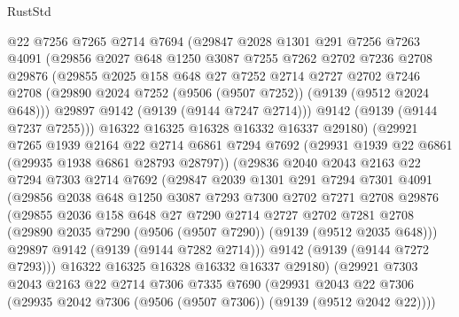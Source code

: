 \begin{lexlean}{RustStd}
\begin{coremodule}
        @22
        @7256
        @7265
        @2714
        @7694
        (@29847
          @2028
          @1301
          @291
          @7256
          @7263
          @4091
          (@29856
            @2027
            @648
            @1250
            @3087
            @7255
            @7262
            @2702
            @7236
            @2708
            @29876
            (@29855
              @2025
              @158
              @648
              @27
              @7252
              @2714
              @2727
              @2702
              @7246
              @2708
              (@29890 @2024 @7252 (@9506 (@9507 @7252)) (@9139 (@9512 @2024 @648)))
              @29897
              @9142
              (@9139 (@9144 @7247 @2714)))
            @9142
            (@9139 (@9144 @7237 @7255)))
          @16322
          @16325
          @16328
          @16332
          @16337
          @29180)
        (@29921
          @7265
          @1939
          @2164
          @22
          @2714
          @6861
          @7294
          @7692
          (@29931 @1939 @22 @6861 (@29935 @1938 @6861 @28793 @28797))
          (@29836
            @2040
            @2043
            @2163
            @22
            @7294
            @7303
            @2714
            @7692
            (@29847
              @2039
              @1301
              @291
              @7294
              @7301
              @4091
              (@29856
                @2038
                @648
                @1250
                @3087
                @7293
                @7300
                @2702
                @7271
                @2708
                @29876
                (@29855
                  @2036
                  @158
                  @648
                  @27
                  @7290
                  @2714
                  @2727
                  @2702
                  @7281
                  @2708
                  (@29890 @2035 @7290 (@9506 (@9507 @7290)) (@9139 (@9512 @2035 @648)))
                  @29897
                  @9142
                  (@9139 (@9144 @7282 @2714)))
                @9142
                (@9139 (@9144 @7272 @7293)))
              @16322
              @16325
              @16328
              @16332
              @16337
              @29180)
            (@29921
              @7303
              @2043
              @2163
              @22
              @2714
              @7306
              @7335
              @7690
              (@29931
                @2043
                @22
                @7306
                (@29935 @2042 @7306 (@9506 (@9507 @7306)) (@9139 (@9512 @2042 @22))))

\end{coremodule}
\end{lexlean}
